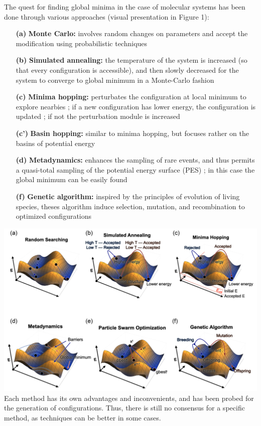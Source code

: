 \documentclass[11pt]{article}
\begin{document}
\begin{multicols}{2}
\noindent The quest for finding global minima in the case of molecular systems has been done through various approaches (visual presentation in Figure 1):
\begin{itemize}
    \itemsep0em
    \item[\textbf{(a)}] \textbf{Monte Carlo:} \small involves random changes on parameters and accept the modification using probabilistic techniques \cite{PhysRevB.95.144104}\normalsize
    \item[\textbf{(b)}] \textbf{Simulated annealing:} \small the temperature of the system is increased (so that every configuration is accessible), and then slowly decreased for the system to converge to global minimum in a Monte-Carlo fashion \cite{B003447I}\normalsize
    \item[\textbf{(c)}] \textbf{Minima hopping:} \small perturbates the configuration at local minimum to explore nearbies ; if a new configuration has lower energy, the configuration is updated ; if not the perturbation module is increased \cite{minima_hopping}\normalsize
    \item[\textbf{(c')}] \textbf{Basin hopping:} \small similar to minima hopping, but focuses rather on the basins of potential energy\normalsize
    \item[\textbf{(d)}] \textbf{Metadynamics:} \small enhances the sampling of rare events, and thus permits a quasi-total sampling of the potential energy surface (PES) ; in this case the global minimum can be easily found \cite{C2CE06642D}\normalsize
    \item[\textbf{(f)}] \textbf{Genetic algorithm:} \small inspired by the principles of evolution of living species, theses algorithm induce selection, mutation, and recombination to optimized configurations \cite{Falls2020}\normalsize
\end{itemize}\normalsize
\medskip

              \noindent \includegraphics[width=\columnwidth]{figures/optim_figures.png}
                \medskip
\newpage
\normalsize Each method has its own advantages and inconvenients, and has been probed for the generation of configurations. Thus, there is still no consensus for a specific method, as techniques can be better in some cases. \vspace{1em}


\end{multicols}
\end{document}
